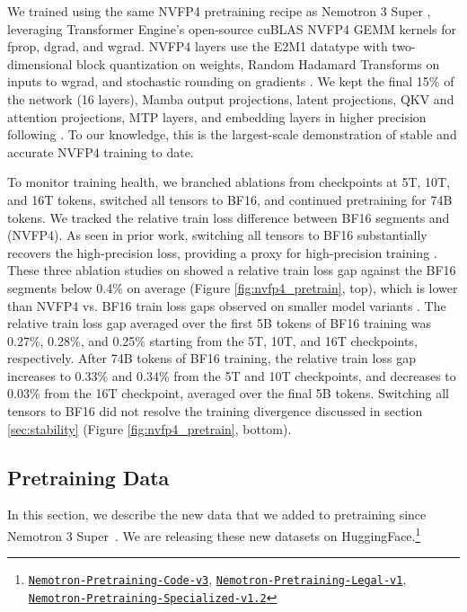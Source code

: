 We trained \ourmodel using the same NVFP4 pretraining recipe as Nemotron 3 Super \cite{nvidia2026nemotron3superopen}, leveraging Transformer Engine's open-source cuBLAS NVFP4 GEMM kernels for fprop, dgrad, and wgrad. NVFP4 layers use the E2M1 datatype with two-dimensional block quantization on weights, Random Hadamard Transforms on inputs to wgrad, and stochastic rounding on gradients \cite{nvidia2025pretraininglargelanguagemodels}. We kept the final 15\% of the network (16 layers), Mamba output projections, latent projections, QKV and attention projections, MTP layers, and embedding layers in higher precision following \cite{nvidia2025nvidianemotron3efficient, nvidia2026nemotron3superopen}. To our knowledge, this is the largest-scale demonstration of stable and accurate NVFP4 training to date.

To monitor training health, we branched ablations from checkpoints at 5T, 10T, and 16T tokens, switched all tensors to BF16, and continued pretraining for 74B tokens. We tracked the relative train loss difference between BF16 segments and \ourmodel (NVFP4). As seen in prior work, switching all tensors to BF16 substantially recovers the high-precision loss, providing a proxy for high-precision training \cite{nvidia2025pretraininglargelanguagemodels}.  These three ablation studies on \ourmodel showed a relative train loss gap against the BF16 segments below 0.4\% on average (Figure \ref{fig:nvfp4_pretrain}, top), which is lower than NVFP4 vs. BF16 train loss gaps observed on smaller model variants \cite{nvidia2025nvidianemotron3efficient}. The relative train loss gap averaged over the first 5B tokens of BF16 training was 0.27\%, 0.28\%, and 0.25\% starting from the 5T, 10T, and 16T checkpoints, respectively. After 74B tokens of BF16 training, the relative train loss gap increases to 0.33\% and 0.34\% from the 5T and 10T checkpoints, and decreases to 0.03\% from the 16T checkpoint, averaged over the final 5B tokens. Switching all tensors to BF16 did not resolve the training divergence discussed in section \ref{sec:stability} (Figure \ref{fig:nvfp4_pretrain}, bottom).

\subsection{Pretraining Data}


In this section, we describe the new data that we added to pretraining since Nemotron 3 Super~\citep{nvidia2026nemotron3superopen}. We are releasing these new datasets on HuggingFace.\footnote{\href{https://huggingface.co/datasets/nvidia/Nemotron-Pretraining-Code-v3}{\texttt{Nemotron-Pretraining-Code-v3}}, \href{https://huggingface.co/datasets/nvidia/Nemotron-Pretraining-Legal-v1}{\texttt{Nemotron-Pretraining-Legal-v1}}, \href{https://huggingface.co/datasets/nvidia/Nemotron-Pretraining-Specialized-v1.2}{\texttt{Nemotron-Pretraining-Specialized-v1.2}}}

